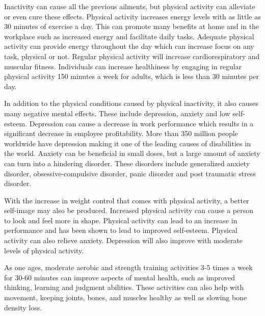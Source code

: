 \documentclass[12pt,journal]{IEEEtran}
\begin{document}
		Inactivity can cause all the previous ailments, but physical activity can alleviate or even cure these effects. 
		Physical activity increases energy levels with as little as 30 minutes of exercise a day. \cite{16} This can promote 
		many benefits at home and in the workplace such as increased energy and facilitate daily tasks.  Adequate physical 
		activity can provide energy throughout the day which can increase focus on any task, physical or not. \cite{17}  
		Regular physical activity will increase cardiorespiratory and muscular fitness. \cite{3} Individuals can increase 
		healthiness by engaging in regular physical activity 150 minutes a week for adults, which is less than 30 minutes 
		per day. \cite{18}
		
		In addition to the physical conditions caused by physical inactivity, it also causes many negative mental effects.
		These include depression, anxiety and low self-esteem.  Depression can cause a decrease in work performance which 
		results in a significant decrease in employee profitability. \cite{11}  More than 350 million people worldwide have 
		depression making it one of the leading causes of disabilities in the world.  \cite{12} Anxiety can be beneficial in 
		small doses, but a large amount of anxiety can turn into a hindering disorder. These disorders include generalized 
		anxiety disorder, obsessive-compulsive disorder, panic disorder and post traumatic stress disorder. \cite{13}  
		
		With the increase in weight control that comes with physical activity, a better self-image may also be produced.  
		Increased physical activity can cause a person to look and feel more in shape.  Physical activity can lead to an increase 
		in performance and has been shown to lead to improved self-esteem.  Physical activity can also relieve anxiety. 
		\cite{13} Depression will also improve with moderate levels of physical activity. \cite{16}
		
		As one ages, moderate aerobic and strength training activities 3-5 times a week for 30-60 minutes can improve aspects 
		of mental health, such as improved thinking, learning and judgment abilities. These activities can also help with 
		movement, keeping joints, bones, and muscles healthy as well as slowing bone density loss. \cite{18}
		
\end{document}
